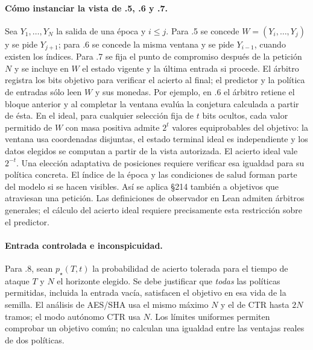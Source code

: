 \paragraph{Cómo instanciar la vista de .5, .6 y .7.}
Sea \(Y_1,\ldots,Y_N\) la salida de una época y \(i\le j\).
Para .5 se concede \(W=(Y_i,\ldots,Y_j)\) y se pide \(Y_{j+1}\);
para .6 se concede la misma ventana y se pide \(Y_{i-1}\), cuando existen
los índices. Para .7 se fija el punto de compromiso después de la petición
\(N\) y se incluye en \(W\) el estado vigente y la última entrada si procede.
El árbitro registra los bits objetivo para verificar el acierto al final;
el predictor y la política de entradas sólo leen \(W\) y sus monedas.
Por ejemplo, en .6 el árbitro retiene el bloque anterior y al completar
la ventana evalúa la conjetura calculada a partir de ésta. En el ideal, para
cualquier selección fija de \(t\) bits ocultos, cada valor permitido de \(W\)
con masa positiva admite \(2^t\) valores equiprobables del objetivo:
la ventana usa coordenadas disjuntas, el estado terminal ideal es independiente
y los datos elegidos se computan a partir de la vista autorizada. El acierto
ideal vale \(2^{-t}\). Una elección adaptativa de posiciones requiere verificar
esa igualdad para su política concreta. El índice de la época y las condiciones
de salud forman parte del modelo si se hacen visibles.
Así se aplica §214 también a objetivos que atraviesan una petición.
Las definiciones de observador en Lean admiten árbitros generales; el cálculo
del acierto ideal requiere precisamente esta restricción sobre el predictor.

\paragraph{Entrada controlada e inconspicuidad.}
Para .8, sean \(p_\star(T,t)\) la probabilidad de acierto tolerada para el
tiempo de ataque \(T\) y \(N\) el horizonte elegido. Se debe justificar que
\emph{todas} las políticas permitidas, incluida la entrada vacía, satisfacen
el objetivo en esa vida de la semilla. El análisis de AES/SHA usa el mismo
máximo \(N\) y el de CTR hasta \(2N\) tramos; el modo autónomo CTR usa \(N\).
Los límites uniformes permiten comprobar un objetivo común; no calculan una
igualdad entre las ventajas reales de dos políticas.

